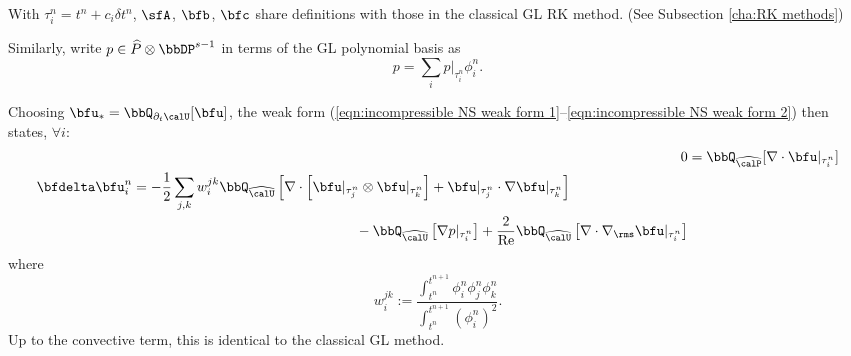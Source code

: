 \begin{example}
        With $\tau^{n}_{i} = t^{n} + c_{i}\delta t^{n}$, $\sfA$, $\bfb$, $\bfc$ share definitions with those in the classical GL RK method. (See Subsection \ref{cha:RK methods})

        Similarly, write $p \in \widehat{P}\otimes\bbDP^{s - 1}$ in terms of the GL polynomial basis as
        \begin{equation}
            p  =  \sum_{i}p|_{\tau^{n}_{i}}\phi^{n}_{i}.
        \end{equation}

        Choosing $\bfu_{*} = \bbQ_{\partial_{t}\calU}[\bfu]$, the weak form (\ref{eqn:incompressible NS weak form 1}--\ref{eqn:incompressible NS weak form 2}) then states, $\forall i$:
        \begin{align}
                                                                                0  &=  \bbQ_{\widehat{\calP}}[\nabla\cdot\bfu|_{\tau^{n}_{i}}]  \\
            \begin{split}
                \bfdelta\bfu^{n}_{i}  &=  - \frac{1}{2}\sum_{j, k}w_{i}^{jk}\bbQ_{\widehat{\calU}}\left[\nabla\cdot\left[\bfu|_{\tau^{n}_{j}}\otimes\bfu|_{\tau^{n}_{k}}\right] + \bfu|_{\tau^{n}_{j}}\cdot\nabla\bfu|_{\tau^{n}_{k}}\right]  \\
                                      &\qquad\qquad\qquad\qquad\qquad\qquad\qquad\qquad- \bbQ_{\widehat{\calU}}\left[\nabla p|_{\tau^{n}_{i}}\right] + \frac{2}{\rmRe}\bbQ_{\widehat{\calU}}\left[\nabla\cdot\nabla_{\rms}\bfu|_{\tau^{n}_{i}}\right]
            \end{split}
        \end{align}
        where
        \begin{equation}\label{eqn:w_i^jk definition}
            w_{i}^{jk}  :=  \frac{\int_{t^{n}}^{t^{n + 1}}\phi^{n}_{i}\phi^{n}_{j}\phi^{n}_{k}}{\int_{t^{n}}^{t^{n + 1}}(\phi^{n}_{i})^{2}}.
        \end{equation}
        Up to the convective term, this is identical to the classical GL method.
        

\end{example}
